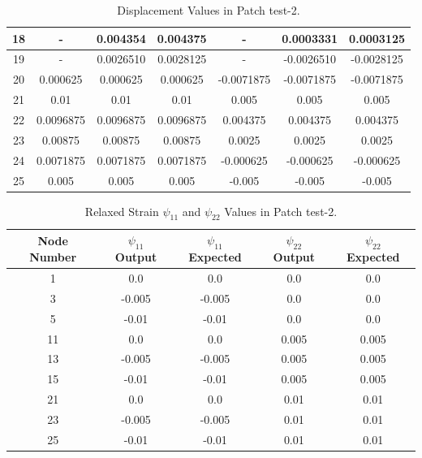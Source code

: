 \documentclass[12pt]{article}
\begin{document}
\begin{table}[H]
\begin{tabular}{||c c c c c c c||}
			\rowcolor{lightgray} 18 & - & 0.004354 & 0.004375 & - & 0.0003331 & 0.0003125 \\ 
			[0.8ex]
			\hline
			\rowcolor{lightgray} 19 & - & 0.0026510 & 0.0028125 & - & -0.0026510 & -0.0028125  \\ 
			[0.8ex]
			\hline
			20 & 0.000625 & 0.000625 & 0.000625 & -0.0071875 & -0.0071875 & -0.0071875  \\ 
			[0.8ex]
			\hline
			21 & 0.01 & 0.01 & 0.01 & 0.005 & 0.005 & 0.005  \\ 
			[0.8ex]
			\hline
			22 & 0.0096875 & 0.0096875 & 0.0096875 & 0.004375 & 0.004375 & 0.004375 \\ 
			[0.8ex]
			\hline
			23 & 0.00875 & 0.00875 & 0.00875 & 0.0025 & 0.0025 & 0.0025 \\ 
			[0.8ex]
			\hline
			24 & 0.0071875 & 0.0071875 & 0.0071875 & -0.000625 & -0.000625 & -0.000625 \\ 
			[0.8ex]	
			\hline
			25 & 0.005 & 0.005 & 0.005 & -0.005 & -0.005 & -0.005 \\  [0.8ex] 
			\hline
		\end{tabular}
		\caption{Displacement Values in Patch test-2.}

\end{table}

\begin{table}[H]
	\begin{center}
		\begin{tabular}{||c c c c c||} 
			\hline
			Node Number & $\psi_{11}$ Output & $\psi_{11}$ Expected  & $\psi_{22}$ Output & $\psi_{22}$ Expected \\ [0.8ex] 
			\hline\hline
			1 & 0.0 & 0.0 & 0.0 & 0.0  \\ 
			[0.8ex]
			\hline
			3 & -0.005 & -0.005 & 0.0 & 0.0  \\ 
			[0.8ex]
			\hline
			5 & -0.01 & -0.01 & 0.0 & 0.0   \\ 
			[0.8ex]
			\hline
			11 & 0.0 & 0.0 & 0.005 & 0.005   \\ 
			[0.8ex]
			\hline
			\rowcolor{lightgray} 13 & -0.005 & -0.005 & 0.005 & 0.005  \\ 
			[0.8ex]
			\hline
			15 & -0.01 & -0.01 & 0.005 & 0.005  \\ 
			[0.8ex]
			\hline
			21 & 0.0 & 0.0 & 0.01 & 0.01  \\ 
			[0.8ex]
			\hline
			23 & -0.005 & -0.005 & 0.01 & 0.01  \\ 
			[0.8ex]
			\hline	
			25 & -0.01 & -0.01 & 0.01 & 0.01   \\ 
			[0.8ex]
			\hline
		\end{tabular}
		\caption{Relaxed Strain $\psi_{11}$ and $\psi_{22}$ Values in Patch test-2.}
	\end{center}
\end{table}
\end{document}
